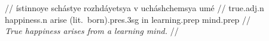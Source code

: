\documentclass{article}
\begin{document}
\ex
\begingl
\gla {}      //
\glb \'{i}stinnoye sch\'{a}stye rozhd\'{a}yetsya v uch\'{a}shchemsya um\'{e} //
\glc true.{\sc adj.n} happiness.{\sc n} {arise (lit.\ born).{\sc pres.3sg}} in learning.{\sc prep} mind.{\sc prep} //
\\\textit{True happiness arises from a learning mind.} //
\endgl
\xe
\end{document}
